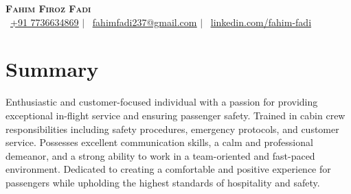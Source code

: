 \documentclass[a4paper,11pt]{article}
\begin{document}
\begin{minipage}[c]{0.15\textwidth}
\end{minipage}
\begin{minipage}[t]{0.84\textwidth}  %
	\begin{center}
		{\selectfont \textbf{\Huge \scshape {Fahim Firoz Fadi}}} \\ \vspace{1pt}
		\small{
			\raisebox{-0.1\height}\faPhone\ \href{tel:+917736634869}{\underline{+91 7736634869}} $|$
			\raisebox{-0.2\height}\faEnvelope\ \href{mailto:fahimfadi237@gmail.com}{\underline{fahimfadi237@gmail.com}} $|$
			\raisebox{-0.2\height}\faLinkedin\ \href{https://www.linkedin.com/in/fahim-fadi-816155310}{\underline{linkedin.com/fahim-fadi}}
		}
	\end{center}
\end{minipage}


\section{Summary}
\begin{itemize}[leftmargin=0.15in, label={}]
	\small{\item{
		Enthusiastic and customer-focused individual with a passion for providing exceptional in-flight service and ensuring passenger safety. Trained in cabin crew responsibilities including safety procedures, emergency protocols, and customer service. Possesses excellent communication skills, a calm and professional demeanor, and a strong ability to work in a team-oriented and fast-paced environment. Dedicated to creating a comfortable and positive experience for passengers while upholding the highest standards of hospitality and safety.
				}}
\end{itemize}
\end{document}
